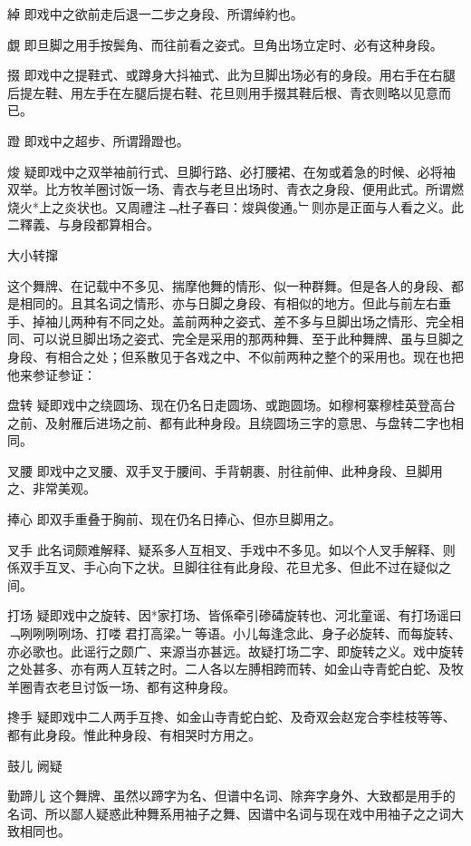 \quad 綽
\quad 即戏中之欲前走后退一二步之身段、所谓绰約也。

\quad 覷
\quad 即旦脚之用手按鬓角、而往前看之姿式。旦角出场立定时、必有这种身段。

\quad 掇\quad 
即戏中之提鞋式、或蹲身大抖袖式、此为旦脚出场必有的身段。用右手在右腿后提左鞋、用左手在左腿后提右鞋、花旦则用手掇其鞋后根、青衣则略以见意而已。

\quad 蹬\quad 
即戏中之超步、所谓𨃴蹬也。

\quad 焌\quad 
疑即戏中之双举袖前行式、旦脚行路、必打腰裙、在匆或着急的时候、必将袖双举。比方牧羊圈讨饭一场、青衣与老旦出场时、青衣之身段、便用此式。所谓燃烧火*上之炎状也。又周禮注﹁杜子春曰：焌與俊通。﹂则亦是正面与人看之义。此二釋義、与身段都算相合。

\quad 大小转撺\quad 


这个舞牌、在记载中不多见、揣摩他舞的情形、似一种群舞。但是各人的身段、都是相同的。且其名词之情形、亦与日脚之身段、有相似的地方。但此与前左右垂手、掉袖儿两种有不同之处。盖前两种之姿式、差不多与旦脚出场之情形、完全相同、可以说旦脚出场之姿式、完全是采用的那两种舞、至于此种舞牌、虽与旦脚之身段、有相合之处；但系散见于各戏之中、不似前两种之整个的采用也。现在也把他来参证参证：

\quad 盘转
\quad 疑即戏中之绕圆场、现在仍名日走圆场、或跑圆场。如穆柯寨穆桂英登高台之前、及射雁后进场之前、都有此种身段。且绕圆场三字的意思、与盘转二字也相同。

\quad 叉腰
\quad 
即戏中之叉腰、双手叉于腰间、手背朝裹、肘往前伸、此种身段、旦脚用之、非常美观。

\quad 捧心
\quad 
即双手重叠于胸前、现在仍名日捧心、但亦旦脚用之。

\quad 叉手
\quad 
此名词颇难解释、疑系多人互相叉、手戏中不多见。如以个人叉手解释、则係双手互叉、手心向下之状。旦脚往往有此身段、花旦尤多、但此不过在疑似之间。

\quad 打场 
\quad 
疑即戏中之旋转、因*家打场、皆係牵引碜碡旋转也、河北童谣、有打场谣曰﹁咧咧咧咧场、打喽𢾶君打高梁。﹂等语。小儿每逢念此、身子必旋转、而每旋转、亦必歌也。此谣行之颇广、来源当亦甚远。故疑打场二字、即旋转之义。戏中旋转之处甚多、亦有两人互转之时。二人各以左膊相跨而转、如金山寺青蛇白蛇、及牧羊圈青衣老旦讨饭一场、都有这种身段。

\quad 搀手 
\quad 
疑即戏中二人两手互搀、如金山寺青蛇白蛇、及奇双会赵宠合李桂枝等等、都有此身段。惟此种身段、有相哭时方用之。

\quad 鼓儿
\quad 
阙疑

\quad 勤蹄儿
\quad 
这个舞牌、虽然以蹄字为名、但谱中名词、除奔字身外、大致都是用手的名词、所以鄙人疑惑此种舞系用袖子之舞、因谱中名词与现在戏中用袖子之之词大致相同也。

